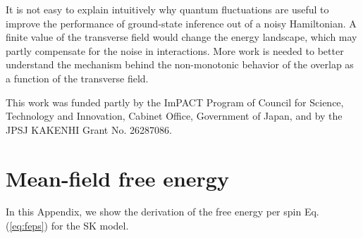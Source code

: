 \documentclass[aps,pra,twocolumn,groupedaddress,longbibliography]{revtex4}
\begin{document}
It is not easy to explain intuitively why quantum fluctuations are useful to improve the performance of ground-state inference out of a noisy Hamiltonian.  A finite value of the transverse field would change the energy landscape, which may partly compensate for the noise in interactions.  More work is needed to better understand the mechanism behind the non-monotonic behavior of the overlap as a function of the transverse field.


\begin{acknowledgments}
This work was funded partly by the ImPACT Program of Council for Science, Technology and Innovation, Cabinet Office, Government of Japan, and by the JPSJ KAKENHI Grant No. 26287086.
\end{acknowledgments}


\appendix
\section{Mean-field free energy}
In this Appendix, we show the derivation of the free energy per spin Eq. (\ref{eq:feps}) for the SK model.
\end{document}
